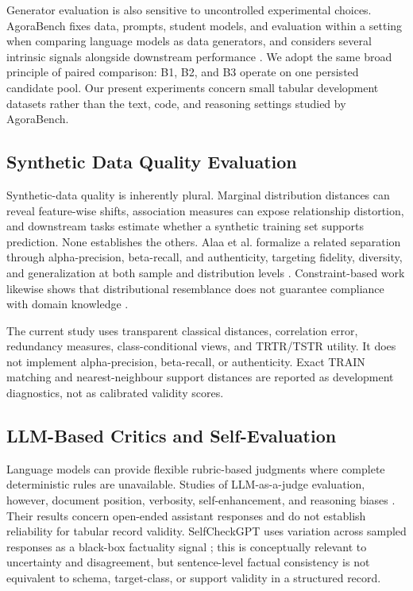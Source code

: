 Generator evaluation is also sensitive to uncontrolled experimental choices.
AgoraBench fixes data, prompts, student models, and evaluation within a setting
when comparing language models as data generators, and considers several
intrinsic signals alongside downstream performance
\citep{kim2025evaluating}. We adopt the same broad principle of paired
comparison: B1, B2, and B3 operate on one persisted candidate pool. Our present
experiments concern small tabular development datasets rather than the text,
code, and reasoning settings studied by AgoraBench.

\subsection{Synthetic Data Quality Evaluation}

Synthetic-data quality is inherently plural. Marginal distribution distances
can reveal feature-wise shifts, association measures can expose relationship
distortion, and downstream tasks estimate whether a synthetic training set
supports prediction. None establishes the others. Alaa et al. formalize a
related separation through alpha-precision, beta-recall, and authenticity,
targeting fidelity, diversity, and generalization at both sample and
distribution levels \citep{alaa2022faithful}. Constraint-based work likewise
shows that distributional resemblance does not guarantee compliance with
domain knowledge \citep{stoian2024realistic}.

The current study uses transparent classical distances, correlation error,
redundancy measures, class-conditional views, and TRTR/TSTR utility. It does
not implement alpha-precision, beta-recall, or authenticity. Exact TRAIN
matching and nearest-neighbour support distances are reported as development
diagnostics, not as calibrated validity scores.

\subsection{LLM-Based Critics and Self-Evaluation}

Language models can provide flexible rubric-based judgments where complete
deterministic rules are unavailable. Studies of LLM-as-a-judge evaluation,
however, document position, verbosity, self-enhancement, and reasoning biases
\citep{zheng2023judging}. Their results concern open-ended assistant responses
and do not establish reliability for tabular record validity. SelfCheckGPT
uses variation across sampled responses as a black-box factuality signal
\citep{manakul2023selfcheckgpt}; this is conceptually relevant to uncertainty
and disagreement, but sentence-level factual consistency is not equivalent to
schema, target-class, or support validity in a structured record.

